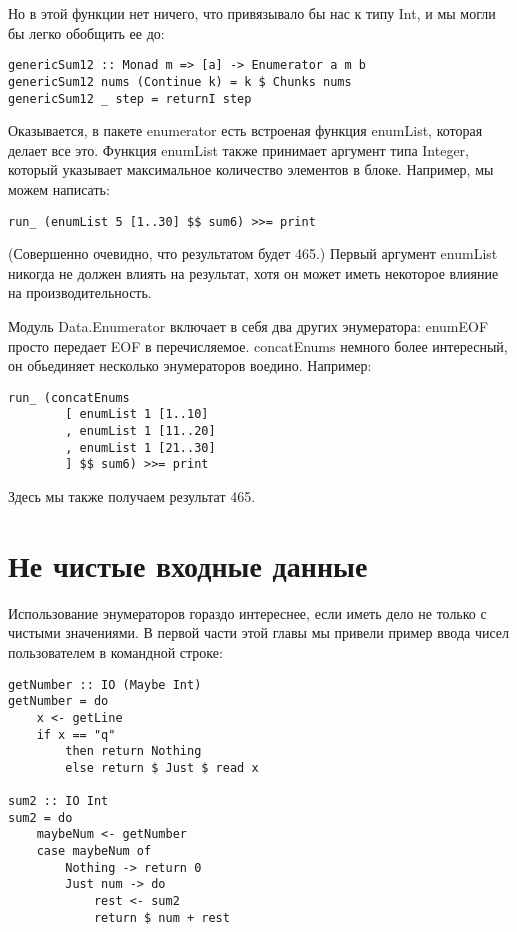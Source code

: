 Но в этой функции нет ничего, что привязывало бы нас к типу Int, и мы могли бы легко обобщить ее до:

\begin{lstlisting}
genericSum12 :: Monad m => [a] -> Enumerator a m b
genericSum12 nums (Continue k) = k $ Chunks nums
genericSum12 _ step = returnI step
\end{lstlisting}%

Оказывается, в пакете enumerator есть встроеная функция enumList, которая делает все это. Функция enumList также принимает аргумент типа Integer, который указывает максимальное количество элементов в блоке. Например, мы можем написать:

\begin{lstlisting}
run_ (enumList 5 [1..30] $$ sum6) >>= print
\end{lstlisting}%

(Совершенно очевидно, что результатом будет 465.) Первый аргумент enumList никогда не должен влиять на результат, хотя он может иметь некоторое влияние на производительность.

Модуль Data.Enumerator включает в себя два других энумератора: enumEOF просто передает EOF в перечисляемое. concatEnums немного более интересный, он обьединяет несколько энумераторов воедино. Например:

\begin{lstlisting}
run_ (concatEnums
        [ enumList 1 [1..10]
        , enumList 1 [11..20]
        , enumList 1 [21..30]
        ] $$ sum6) >>= print
\end{lstlisting}%

Здесь мы также получаем результат 465.

\section{Не чистые входные данные}

Использование энумераторов гораздо интереснее, если иметь дело не только с чистыми значениями. В первой части этой главы мы привели пример ввода чисел пользователем в командной строке:

\begin{lstlisting}
getNumber :: IO (Maybe Int)
getNumber = do
    x <- getLine
    if x == "q"
        then return Nothing
        else return $ Just $ read x

sum2 :: IO Int
sum2 = do
    maybeNum <- getNumber
    case maybeNum of
        Nothing -> return 0
        Just num -> do
            rest <- sum2
            return $ num + rest
\end{lstlisting}%

